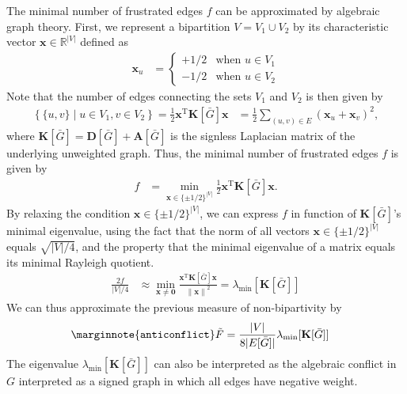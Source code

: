 \documentclass{article}
\begin{document}
The minimal number of frustrated edges $f$ can be approximated by
algebraic graph theory.  First, we represent a bipartition $V = V_1 \cup
V_2$ by its characteristic vector $\mathbf x \in \mathbb R^{|V|}$
defined as
\begin{align*}
  \mathbf x_u &= \left\{ \begin{array}{ll} +1/2 & \text{when $u \in
      V_1$} \\ -1/2 & \text{when $u \in V_2$}
    \end{array} \right. 
\end{align*}
Note that the number of edges connecting the sets $V_1$ and $V_2$ is
then given by
\begin{align*}
\left\{ \{u,v\} \mid u \in V_1, v \in V_2 \right\} = \frac 12 \mathbf
x^{\mathrm T} \mathbf K[\bar G] \mathbf x &= \frac 12 \sum_{(u,v) \in E}
(\mathbf x_u + \mathbf x_v)^2,
\end{align*}
where $\mathbf K[\bar G] = \mathbf D[\bar G] + \mathbf A[\bar G]$ is the
signless Laplacian matrix of the underlying unweighted graph.  Thus, the
minimal number of frustrated edges $f$ is given by
\begin{align*}
  f &= \min_{\mathbf x \in \{\pm 1/2\}^{|V|}} \frac 12 \mathbf
  x^{\mathrm T} \mathbf K[\bar G] \mathbf x.
\end{align*}
By relaxing the condition $\mathbf x \in \{\pm 1/2\}^{|V|}$, we can
express $f$ in function of $\mathbf K[\bar G]$'s minimal eigenvalue,
using the fact that the norm of all vectors $\mathbf x \in \{\pm
1/2\}^{|V|}$ equals $\sqrt{|V|/4}$, and the property that the minimal
eigenvalue of a matrix equals its minimal Rayleigh quotient.
\begin{align*}
  \frac {2f} {|V|/4} &\approx \min_{\mathbf x \neq \mathbf 0} \frac
        {\mathbf x^{\mathrm T} \mathbf K[\bar G] \mathbf x} {\left\|
          \mathbf x \right\|^2} = \lambda_{\min}[\mathbf K[\bar G]]
\end{align*}
We can thus approximate the previous measure of non-bipartivity by
\begin{align}
  \marginnote{\texttt{anticonflict}} \tilde F &= \frac {|V|} {8 |E[\bar
      G]|} \lambda_{\min}[\mathbf K[\bar G]]
\end{align}
The eigenvalue $\lambda_{\min}[\mathbf K[\bar G]]$ can also be
interpreted as the algebraic conflict in $G$ interpreted as a signed
graph in which all edges have negative weight.
\end{document}
